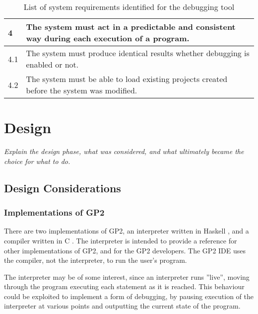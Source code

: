\documentclass[authoryearcitations]{UoYCSproject}
\begin{document}
\begin{table}[tbp]
\begin{tabularx}{\linewidth}{|l|X|}
        4    &  The system must act in a predictable and consistent way during
                each execution of a program. \\ \hline
        4.1  &  The system must produce identical results whether debugging is
                enabled or not. \\ \hline
        4.2  &  The system must be able to load existing projects created before
                the system was modified. \\ \hline
    \end{tabularx}
    \caption{List of system requirements identified for the debugging tool}
    \label{tab:SystemRequirements}
\end{table}

\clearpage


\chapter{Design}
\label{cha:Design}

\emph{Explain the design phase, what was considered, and what ultimately 
became the choice for what to do.}


\section{Design Considerations}

\subsection{Implementations of GP2}
\label{sec:ImplementationsOfGP2}

There are two implementations of GP2, an interpreter written in Haskell
\citep{bak2015,GP2Interpreter}, and a compiler written in C
\citep{bak2015,GP2Compiler}. The interpreter is intended to provide a
reference for other implementations of GP2, and for the GP2 developers. The
GP2 IDE uses the compiler, not the interpreter, to run the user's program.

The interpreter may be of some interest, since an interpreter runs ''live'',
moving through the program executing each statement as it is reached. This
behaviour could be exploited to implement a form of debugging, by pausing
execution of the interpreter at various points and outputting the current state
of the program.
\end{document}
